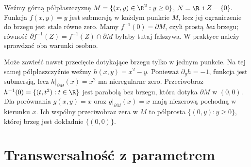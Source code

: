 \begin{przyklad}
\label{prz:transwersalnosc-brzeg-19}
Weźmy górną półpłaszczyznę
$M=\{(x,y)\in\R^2:y\geq0\}$,
$N=\R$ i $Z=\{0\}$. Funkcja $f(x,y)=y$
jest submersją w każdym punkcie $M$,
lecz jej ograniczenie do brzegu jest stale
równe zero. Mamy $f^{-1}(0)=\partial M$,
czyli prostą \emph{bez} brzegu; równość
$\partial f^{-1}(Z)=f^{-1}(Z)\cap\partial M$
byłaby tutaj fałszywa. W praktyce należy
sprawdzać oba warunki osobno.

Może zawieść nawet przecięcie dotykające brzegu tylko w jednym
punkcie. Na tej samej półpłaszczyźnie weźmy $h(x,y)=x^2-y$.
Ponieważ $\partial_yh=-1$, funkcja jest submersją,
lecz $h|_{\partial M}(x)=x^2$ ma nieregularne zero.
Przeciwobraz $h^{-1}(0)=\{(t,t^2):t\in\R\}$
jest parabolą bez brzegu, która dotyka $\partial M$ w $(0,0)$.
Dla porównania $g(x,y)=x$ oraz $g|_{\partial M}(x)=x$
mają niezerową pochodną w kierunku $x$.
Ich wspólny przeciwobraz zera w $M$ to półprosta
$\{(0,y):y\geq0\}$, której brzeg jest dokładnie $\{(0,0)\}$.

\begin{center}
\end{center}
\end{przyklad}

\section{Transwersalność z parametrem}
\label{sec:transwersalnosc-param}

